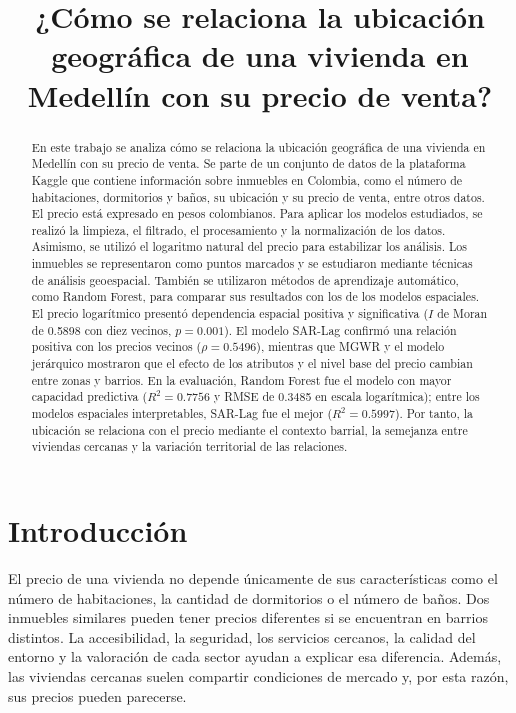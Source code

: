 \documentclass[conference]{IEEEtran}
\title{¿Cómo se relaciona la ubicación geográfica de una vivienda en Medellín con su precio de venta?}
\author{
\IEEEauthorblockN{Kevin Arley Parra Henao}
\IEEEauthorblockA{
Universidad Nacional de Colombia, sede Medellín\\
Curso de Análisis Geoespacial
}
}
\begin{document}
\maketitle

\begin{abstract}
En este trabajo se analiza cómo se relaciona la ubicación geográfica de una vivienda en Medellín con su precio de venta. Se parte de un conjunto de datos de la plataforma Kaggle que contiene información sobre inmuebles en Colombia, como el número de habitaciones, dormitorios y baños, su ubicación y su precio de venta, entre otros datos. El precio está expresado en pesos colombianos. Para aplicar los modelos estudiados, se realizó la limpieza, el filtrado, el procesamiento y la normalización de los datos. Asimismo, se utilizó el logaritmo natural del precio para estabilizar los análisis. Los inmuebles se representaron como puntos marcados y se estudiaron mediante técnicas de análisis geoespacial. También se utilizaron métodos de aprendizaje automático, como Random Forest, para comparar sus resultados con los de los modelos espaciales. El precio logarítmico presentó dependencia espacial positiva y significativa ($I$ de Moran de 0.5898 con diez vecinos, $p=0.001$). El modelo SAR-Lag confirmó una relación positiva con los precios vecinos ($\rho=0.5496$), mientras que MGWR y el modelo jerárquico mostraron que el efecto de los atributos y el nivel base del precio cambian entre zonas y barrios. En la evaluación, Random Forest fue el modelo con mayor capacidad predictiva ($R^2=0.7756$ y RMSE de 0.3485 en escala logarítmica); entre los modelos espaciales interpretables, SAR-Lag fue el mejor ($R^2=0.5997$). Por tanto, la ubicación se relaciona con el precio mediante el contexto barrial, la semejanza entre viviendas cercanas y la variación territorial de las relaciones.
\end{abstract}


\section{Introducción}

El precio de una vivienda no depende únicamente de sus características como el número de habitaciones, la cantidad de dormitorios o el número de baños. Dos inmuebles similares pueden tener precios diferentes si se encuentran en barrios distintos. La accesibilidad, la seguridad, los servicios cercanos, la calidad del entorno y la valoración de cada sector ayudan a explicar esa diferencia. Además, las viviendas cercanas suelen compartir condiciones de mercado y, por esta razón, sus precios pueden parecerse.
\end{document}
